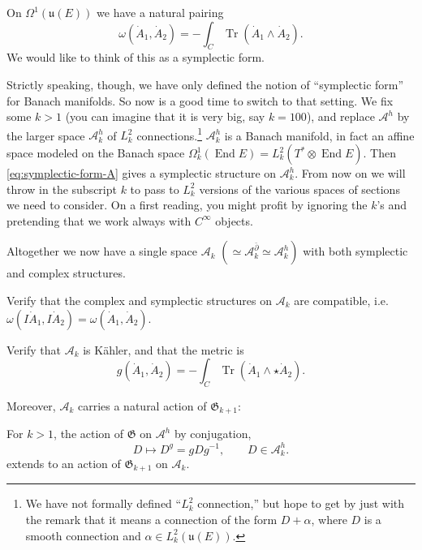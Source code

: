 \documentclass[12pt,letterpaper,reqno]{article}
\numberwithin{equation}{section}
\newcommand{\fu}{{\mathfrak u}}
\newcommand{\fG}{{\mathfrak G}}
\newcommand{\cA}{\ensuremath{\mathcal A}}
\newcommand{\kahler}{K\"ahler\xspace}
\DeclareMathOperator{\Tr}{Tr}
\DeclareMathOperator{\End}{End}
\begin{document}
On $\Omega^{1}(\fu(E))$ we have a natural pairing
\begin{equation} \label{eq:symplectic-form-A}
  \omega(\dot{A}_1,\dot{A}_2) = -\int_C \Tr(\dot{A}_1 \wedge \dot{A}_2).
\end{equation}
We would like to think of this as a symplectic form.

Strictly speaking, though, we have only defined the notion
of ``symplectic form'' for Banach manifolds.
So now is a good time to switch to that setting.
We fix some $k > 1$ (you can imagine that it is very big,
say $k = 100$), and replace $\cA^h$ by the larger space $\cA^h_k$
of $L^2_k$ connections.\footnote{We have not formally defined
``$L^2_k$ connection,'' but hope to get by just with the remark 
that it means a connection of the form $D + \alpha$, 
where $D$ is a smooth connection and $\alpha \in L^2_k(\fu(E))$.}
$\cA^h_k$ is a Banach manifold,
in fact an affine space modeled on the Banach space
$\Omega^1_k(\End E) = L^2_k(T^* \otimes \End E)$. 
Then \eqref{eq:symplectic-form-A} gives a symplectic 
structure on $\cA^h_k$.
From now on we will throw in the subscript $k$ to pass 
to $L^2_k$ versions of the various spaces of sections
we need to consider. On a first reading, you might profit
by ignoring the $k$'s and pretending that we work always
with $C^\infty$ objects.

Altogether we now have a single space $\cA_k$ $(\simeq \cA^{\bar\partial}_k \simeq \cA^h_k)$ with both symplectic and
complex structures.
\begin{exercise} Verify that the complex and symplectic structures
on $\cA_k$ are compatible, i.e. $\omega(I \dot{A}_1, I \dot{A}_2) = \omega(\dot{A}_1,\dot{A}_2)$.
\end{exercise}

\begin{exercise} Verify that $\cA_k$ is \kahler, and that the metric is
\begin{equation}
  g(\dot{A}_1,\dot{A}_2) = - \int_C \Tr(\dot{A}_1 \wedge \star \dot{A}_2).
\end{equation}
\end{exercise}
Moreover, $\cA_k$ carries a natural action of $\fG_{k+1}$:
\begin{prop} For $k>1$, the action of $\fG$ on $\cA^h$ by conjugation,
\begin{equation}
  D \mapsto D^g = g D g^{-1}, \qquad D \in \cA^h_k.
\end{equation}
extends to an action of $\fG_{k+1}$ on $\cA_k$.
\end{prop}
\end{document}
